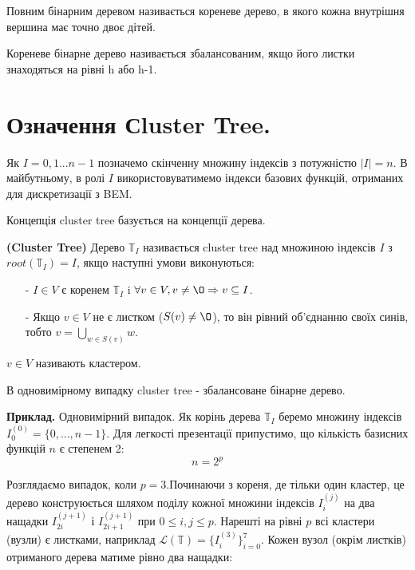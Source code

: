 \documentclass[12pt]{report}
\begin{document}
	\begin{Def}
	 Повним бінарним деревом називається кореневе дерево, в якого кожна внутрішня вершина має точно двоє дітей.
	 \end{Def}
	 \begin{Def}
	 Кореневе бінарне дерево називається збалансованим, якщо його листки знаходяться на рівні h або h-1.
	 \end{Def}
	\section{Означення Сluster Tree.}
	\hspace{0.8cm}Як $I={0,1...n-1}$ позначемо скінченну множину індексів з потужністю $|I|=n$. В майбутньому, в ролі $I$ використовуватимемо індекси базових функцій, отриманих для дискретизації з BEM.
	\par Концепція cluster tree базується на концепції дерева.
	\begin{Def}
	 {\bf (Cluster Tree)} Дерево $\mathbb{T}_{I}$ називається cluster tree над множиною індексів $I$ з $root(\mathbb{T}_{I})=I$, якщо наступні умови виконуються:
	\begin{enumerate}
		\item[-] $I \in V$ є коренем $\mathbb{T}_{I}$ i $\forall v \in V,v\not=\O \Rightarrow v\subseteq I$.
		\item[-] Якщо $v\in V$ не є листком ($S(v)\not=\O$), то він рівний об'єднанню своїх синів, тобто $v=\bigcup_{w\in S(v)}w$.
	\end{enumerate}
	\end{Def}
	\par $v\in V$ називають кластером.
	\par В одновимірному випадку cluster tree - збалансоване бінарне дерево.
	\par {\bf Приклад.} Одновимірний випадок.\newline
	Як корінь дерева $\mathbb{T}_{I}$ беремо множину індексів $I_0^{(0)}=\{0,...,n-1\}$. Для легкості презентації припустимо, що кількість базисних функцій $n$ є степенем 2:
	$$n=2^p$$ 
	\par Розглядаємо випадок, коли $p=3$.Починаючи з кореня, де тільки один кластер, це дерево конструюється шляхом поділу кожної множини індексів $I_i^{(j)}$ на два нащадки $I_{2i}^{(j+1)}$ і $I_{2i+1}^{(j+1)}$ при $0\le i,j\le p$. Нарешті на рівні $p$ всі кластери (вузли) є листками, наприклад $\mathcal{L}(\mathbb{T})=\{I_i^{(3)}\}_{i=0}^7$. Кожен вузол (окрім листків) отриманого дерева матиме рівно два нащадки:
\end{document}
